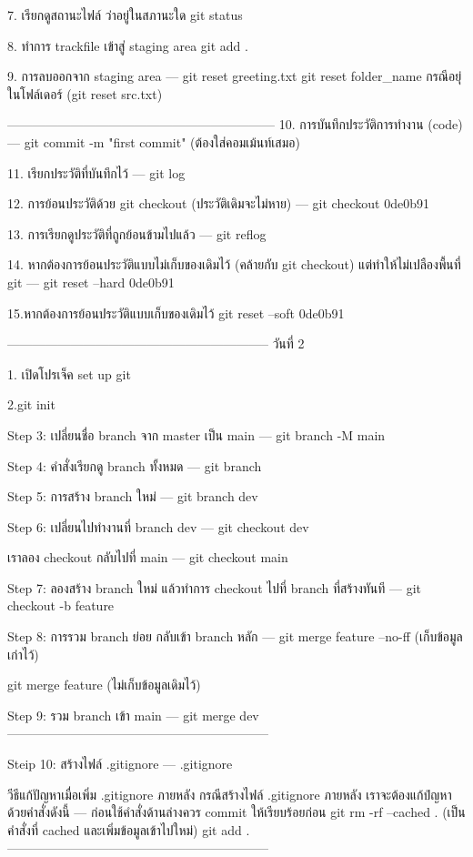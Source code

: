 {{7. เรียกดูสถานะไฟล์ ว่าอยู่ในสภานะใด
 git status

8. ทำการ trackfile เข้าสู่ staging area 
 git add .

9. การลบออกจาก staging area
---
git reset greeting.txt
git reset folder_name กรณีอยุ่ในโฟล์เดอร์
(git reset src\coding.txt)

---------------------------------------------------------------
10. การบันทึกประวัติการทำงาน (code)
---
git commit -m "first commit" (ต้องใส่คอมเม้นท์เสมอ)

11. เรียกประวัติที่บันทึกไว้
---
git log


12. การย้อนประวัติด้วย git checkout (ประวัติเดิมจะไม่หาย)
---
git checkout 0de0b91


13. การเรียกดูประวัติที่ถูกย้อนข้ามไปแล้ว
---
git reflog


14. หากต้องการย้อนประวัติแบบไม่เก็บของเดิมไว้  (คล้ายกับ git checkout) แต่ทำให้ไม่เปลืองพื้นที่ git
---
git reset --hard 0de0b91


15.หากต้องการย้อนประวัติแบบเก็บของเดิมไว้
git reset --soft 0de0b91

--------------------------------------------------------------
วันที่ 2

1. เปิดโปรเจ็ค set up git

2.git init

Step 3: เปลี่ยนชื่อ branch จาก master เป็น main
---
git branch -M main

Step 4: คำสั่งเรียกดู branch ทั้งหมด
---
git branch

Step 5: การสร้าง branch ใหม่
---
git branch dev


Step 6: เปลี่ยนไปทำงานที่ branch dev
---
git checkout dev

เราลอง checkout กลับไปที่ main
---
git checkout main


Step 7: ลองสร้าง branch ใหม่ แล้วทำการ checkout ไปที่ branch ที่สร้างทันที
---
git checkout -b feature


Step 8: การรวม branch  ย่อย กลับเข้า branch หลัก
---
git merge feature --no-ff (เก็บข้อมูลเก่าไว้)

git merge feature (ไม่เก็บข้อมูลเดิมไว้)

Step 9: รวม branch เข้า main
---
git merge dev 
--------------------------------------------------------------

Steip 10: สร้างไฟล์ .gitignore
---
.gitignore

วีธีแก้ปัญหาเมื่อเพิ่ม  .gitignore  ภายหลัง
กรณีสร้างไฟล์ .gitignore ภายหลัง เราจะต้องแก้ปํญหาด้วยคำสั่งดังนี้
---
ก่อนใช้คำสั่งด้านล่างควร commit ให้เรียบร้อยก่อน
git rm -rf --cached . (เป็นคำสั่งที่ cached และเพิ่มข้อมูลเข้าไปใหม่)
git add .
--------------------------------------------------------------
 
}}
